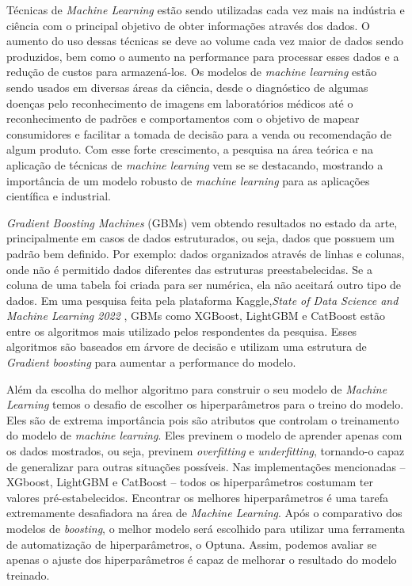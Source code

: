 \newcommand{\comando}[1]{\textbf{$\backslash$#1}}


Técnicas de \textit{Machine Learning} estão sendo utilizadas cada vez mais na indústria e ciência com o principal objetivo de obter informações através dos dados. O aumento do uso dessas técnicas se deve ao volume cada vez maior de dados sendo produzidos, bem como o aumento na performance para processar esses dados e a redução de custos para armazená-los. Os modelos de \textit{machine learning} estão sendo usados em diversas áreas da ciência, desde o diagnóstico de algumas doenças pelo reconhecimento de imagens em laboratórios médicos até o reconhecimento de padrões e comportamentos com o objetivo de mapear consumidores e facilitar a tomada de decisão para a venda ou recomendação de algum produto. Com esse forte crescimento, a pesquisa na área teórica e na aplicação de técnicas de \textit{machine learning} vem se se destacando, mostrando a importância de um modelo robusto de \textit{machine learning} para as aplicações científica e industrial.

\textit{Gradient Boosting Machines} (GBMs) vem obtendo resultados no estado da arte, principalmente em casos de dados estruturados, ou seja, dados que possuem um padrão bem definido. Por exemplo: dados organizados através de linhas e colunas, onde não é permitido dados diferentes das estruturas preestabelecidas. Se a coluna de uma tabela foi criada para ser numérica, ela não aceitará outro tipo de dados. Em uma pesquisa feita pela plataforma Kaggle,\textit{State of Data Science and Machine Learning 2022} \cite{kaggle}, GBMs como XGBoost, LightGBM e CatBoost estão entre os algoritmos mais utilizado pelos respondentes da pesquisa. Esses algoritmos são baseados em árvore de decisão e utilizam uma estrutura de \textit{Gradient boosting} para aumentar a performance do modelo.

Além da escolha do melhor algoritmo para construir o seu modelo de \textit{Machine Learning} temos o desafio de escolher os hiperparâmetros para o treino do modelo. Eles são de extrema importância pois são atributos que controlam o treinamento do modelo de \textit{machine learning}. Eles previnem o modelo de aprender apenas com os dados mostrados,  ou seja, previnem \textit{overfitting} e \textit{underfitting}, tornando-o capaz de generalizar para outras situações possíveis. Nas implementações mencionadas -- XGboost, LightGBM e CatBoost -- todos os hiperparâmetros costumam ter valores pré-estabelecidos. Encontrar os melhores hiperparâmetros é uma tarefa extremamente desafiadora na área de \textit{Machine Learning}. Após o comparativo dos modelos de \textit{boosting}, o melhor modelo será escolhido para utilizar uma ferramenta de automatização de hiperparâmetros, o Optuna. Assim, podemos avaliar se apenas o ajuste dos hiperparâmetros é capaz de melhorar o resultado do modelo treinado.

